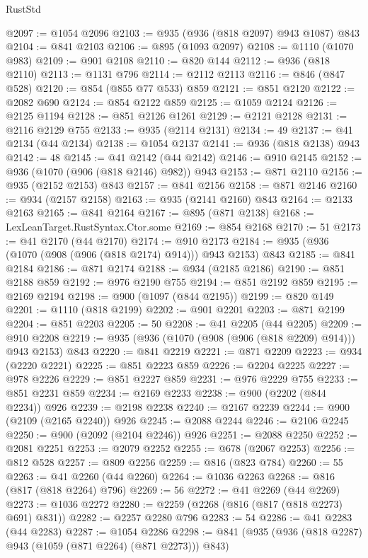 \begin{lexlean}{RustStd}
\begin{coremodule}
@2097 := @1054 @2096
@2103 := @935 (@936 (@818 @2097) @943 @1087) @843
@2104 := @841 @2103
@2106 := @895 (@1093 @2097)
@2108 := @1110 (@1070 @983)
@2109 := @901 @2108
@2110 := @820 @144
@2112 := @936 (@818 @2110)
@2113 := @1131 @796
@2114 := @2112 @2113
@2116 := @846 (@847 @528)
@2120 := @854 (@855 @77 @533) @859
@2121 := @851 @2120
@2122 := @2082 @690
@2124 := @854 @2122 @859
@2125 := @1059 @2124
@2126 := @2125 @1194
@2128 := @851 @2126 @1261
@2129 := @2121 @2128
@2131 := @2116 @2129 @755
@2133 := @935 (@2114 @2131)
@2134 := 49
@2137 := @41 @2134 (@44 @2134)
@2138 := @1054 @2137
@2141 := @936 (@818 @2138) @943
@2142 := 48
@2145 := @41 @2142 (@44 @2142)
@2146 := @910 @2145
@2152 := @936 (@1070 (@906 (@818 @2146) @982)) @943
@2153 := @871 @2110
@2156 := @935 (@2152 @2153) @843
@2157 := @841 @2156
@2158 := @871 @2146
@2160 := @934 (@2157 @2158)
@2163 := @935 (@2141 @2160) @843
@2164 := @2133 @2163
@2165 := @841 @2164
@2167 := @895 (@871 @2138)
@2168 := LexLeanTarget.RustSyntax.Ctor.some
@2169 := @854 @2168
@2170 := 51
@2173 := @41 @2170 (@44 @2170)
@2174 := @910 @2173
@2184 := @935 (@936 (@1070 (@908 (@906 (@818 @2174) @914))) @943 @2153) @843
@2185 := @841 @2184
@2186 := @871 @2174
@2188 := @934 (@2185 @2186)
@2190 := @851 @2188 @859
@2192 := @976 @2190 @755
@2194 := @851 @2192 @859
@2195 := @2169 @2194
@2198 := @900 (@1097 (@844 @2195))
@2199 := @820 @149
@2201 := @1110 (@818 @2199)
@2202 := @901 @2201
@2203 := @871 @2199
@2204 := @851 @2203
@2205 := 50
@2208 := @41 @2205 (@44 @2205)
@2209 := @910 @2208
@2219 := @935 (@936 (@1070 (@908 (@906 (@818 @2209) @914))) @943 @2153) @843
@2220 := @841 @2219
@2221 := @871 @2209
@2223 := @934 (@2220 @2221)
@2225 := @851 @2223 @859
@2226 := @2204 @2225
@2227 := @978 @2226
@2229 := @851 @2227 @859
@2231 := @976 @2229 @755
@2233 := @851 @2231 @859
@2234 := @2169 @2233
@2238 := @900 (@2202 (@844 @2234)) @926
@2239 := @2198 @2238
@2240 := @2167 @2239
@2244 := @900 (@2109 (@2165 @2240)) @926
@2245 := @2088 @2244
@2246 := @2106 @2245
@2250 := @900 (@2092 (@2104 @2246)) @926
@2251 := @2088 @2250
@2252 := @2081 @2251
@2253 := @2079 @2252
@2255 := @678 (@2067 @2253)
@2256 := @812 @528
@2257 := @809 @2256
@2259 := @816 (@823 @784)
@2260 := 55
@2263 := @41 @2260 (@44 @2260)
@2264 := @1036 @2263
@2268 := @816 (@817 (@818 @2264) @796)
@2269 := 56
@2272 := @41 @2269 (@44 @2269)
@2273 := @1036 @2272
@2280 := @2259 (@2268 (@816 (@817 (@818 @2273) @691) @831))
@2282 := @2257 @2280 @796
@2283 := 54
@2286 := @41 @2283 (@44 @2283)
@2287 := @1054 @2286
@2298 := @841 (@935 (@936 (@818 @2287) @943 (@1059 (@871 @2264) (@871 @2273))) @843)

\end{coremodule}
\end{lexlean}
